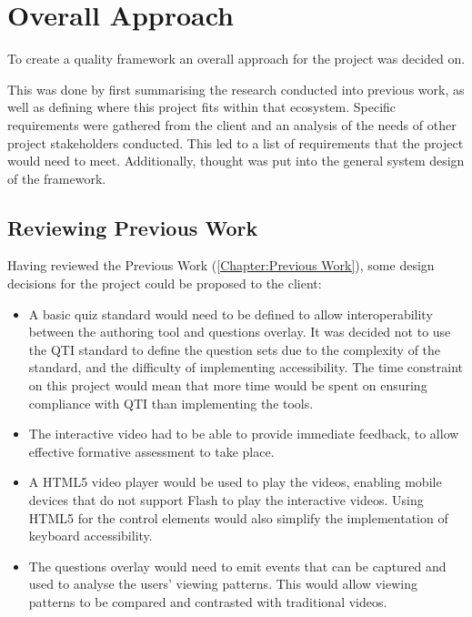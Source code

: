 \chapter{Overall Approach}
\label{Chapter:Overall Approach}

\begin{preamble}
	To create a quality framework an overall approach for the project was decided on.

	This was done by first summarising the research conducted into previous work, as well as defining where this project fits within that ecosystem. Specific requirements were gathered from the client and an analysis of the needs of other project stakeholders conducted. This led to a list of requirements that the project would need to meet. Additionally, thought was put into the general system design of the framework.
\end{preamble}

\section{Reviewing Previous Work}
\label{Section:Reviewing Previous Work}
Having reviewed the Previous Work (\autoref{Chapter:Previous Work}), some design decisions for the project could be proposed to the client:
\begin{itemize}
	\item A basic quiz standard would need to be defined to allow interoperability between the authoring tool and questions overlay. It was decided not to use the \gls{QTI} standard to define the question sets due to the complexity of the standard, and the difficulty of implementing accessibility. The time constraint on this project would mean that more time would be spent on ensuring compliance with \gls{QTI} than implementing the tools.

	\item The interactive video had to be able to provide immediate feedback, to allow effective formative assessment to take place.

	\item A \gls{HTML5} video player would be used to play the videos, enabling mobile devices that do not support Flash to play the interactive videos. Using \gls{HTML5} for the control elements would also simplify the implementation of keyboard accessibility.

	\item The questions overlay would need to emit events that can be captured and used to analyse the users' viewing patterns. This would allow viewing patterns to be compared and contrasted with traditional videos.
\end{itemize}

